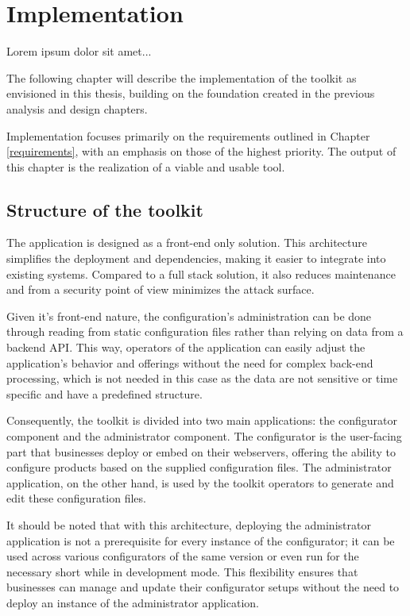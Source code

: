 \chapter{Implementation}

\begin{chapterabstract}
Lorem ipsum dolor sit amet...
\end{chapterabstract}

The following chapter will describe the implementation of the toolkit as envisioned in this thesis, building on the foundation created in the previous analysis and design chapters. 

Implementation focuses primarily on the requirements outlined in Chapter \ref{requirements}, with an emphasis on those of the highest priority. The output of this chapter is the realization of a viable and usable tool.

\section{Structure of the toolkit}

The application is designed as a front-end only solution. This architecture simplifies the deployment and dependencies, making it easier to integrate into existing systems. Compared to a full stack solution, it also reduces maintenance and from a security point of view minimizes the attack surface. 

Given it's front-end nature, the configuration's administration can be done through reading from static configuration files rather than relying on data from a backend API. This way, operators of the application can easily adjust the application's behavior and offerings without the need for complex back-end processing, which is not needed in this case as the data are not sensitive or time specific and have a predefined structure. 

Consequently, the toolkit is divided into two main applications: the configurator component and the administrator component. The configurator is the user-facing part that businesses deploy or embed on their webservers, offering the ability to configure products based on the supplied configuration files. The administrator application, on the other hand, is used by the toolkit operators to generate and edit these configuration files.

It should be noted that with this architecture, deploying the administrator application is not a prerequisite for every instance of the configurator; it can be used across various configurators of the same version or even run for the necessary short while in development mode. This flexibility ensures that businesses can manage and update their configurator setups without the need to deploy an instance of the administrator application.

